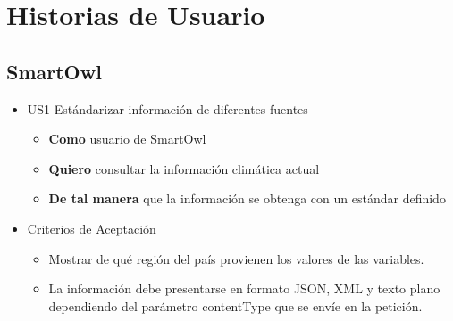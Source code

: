 \section*{Historias de Usuario}
\subsection*{SmartOwl}
\begin{itemize}
  \item US1 Estándarizar información de diferentes fuentes
  \begin{itemize}
    \item \textbf{Como} usuario de SmartOwl
    \item \textbf{Quiero} consultar la información climática actual
    \item \textbf{De tal manera} que la información se obtenga con un estándar definido
  \end{itemize}
  \item Criterios de Aceptación
  \begin{itemize}
    \item Mostrar de qué región del país provienen los valores de las variables.
    \item La información debe presentarse en formato JSON, XML y texto plano dependiendo del parámetro contentType que se envíe en la petición.
  \end{itemize}
\end{itemize}

